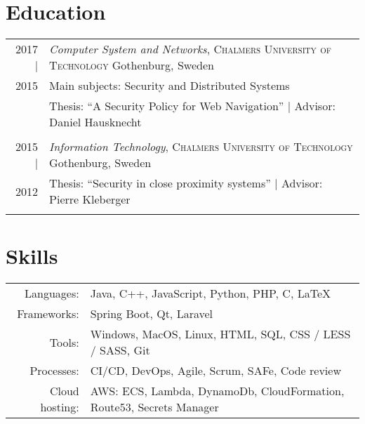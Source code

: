 \documentclass[a4paper,10pt]{scrartcl} %
\begin{document}

\section{Education}

\begin{tabular}{r|p{15cm}}	
2017 |	        & \emph{Computer System and Networks}, \textsc{Chalmers University of Technology} \hfill Gothenburg, Sweden \\
2015			        & \footnotesize{Main subjects: Security and Distributed Systems} \\
\phantom{abcdefghijklm}	& \footnotesize{Thesis: ``A Security Policy for Web Navigation'' | Advisor: Daniel Hausknecht} \\
\multicolumn{2}{c}{} \\


2015 |      	& \emph{Information Technology}, \textsc{Chalmers University of Technology} \hfill Gothenburg, Sweden \\
2012			& \footnotesize{Thesis: ``Security in close proximity systems'' | Advisor: Pierre Kleberger} \\
\multicolumn{2}{c}{} \\

\end{tabular}


\section{Skills}

\begin{tabular}{rp{15cm}}
\phantom{abcde} Languages: 		    & Java, C++, JavaScript, Python, PHP, C, \LaTeX \\
Frameworks:	                        & Spring Boot, Qt, Laravel \\
Tools:	                            & Windows, MacOS, Linux, HTML, SQL, CSS / LESS / SASS, Git \\
Processes:                          & CI/CD, DevOps, Agile, Scrum, SAFe, Code review \\
Cloud hosting:                      & AWS: ECS, Lambda, DynamoDb, CloudFormation, Route53, Secrets Manager
\end{tabular}


\newpage
\end{document}
